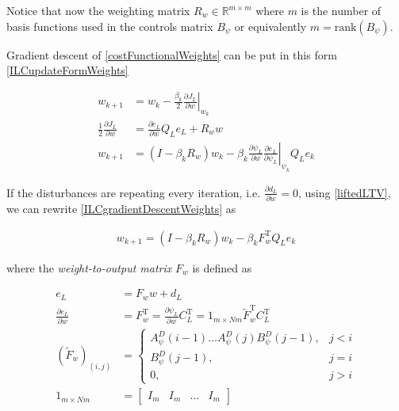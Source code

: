 \documentclass[10pt,a4paper]{article}
\newcommand\at[2]{\left.#1\right|_{#2}} %
\newcommand{\error}{e} %
\newcommand{\linDist}{d} %
\newcommand{\fullvec}{\psi} %
\newcommand{\weights}{w} %
\newcommand{\ValueFunction}{J}
\begin{document}
Notice that now the weighting matrix $R_w \in \mathbb{R}^{m \times m}$ where $m$ is the number of basis functions used in the controls matrix $B_{\fullvec}$ or equivalently $m = \text{rank}(B_{\fullvec})$.

Gradient descent of \eqref{costFunctionalWeights} can be put in this form \eqref{ILCupdateFormWeights}

\begin{equation}
\begin{aligned}
\weights_{k+1} &= \weights_k - \frac{\beta_k}{2} \at{\frac{\partial{\ValueFunction_L}}{\partial{\weights}}}{\weights_k} \\
\frac{1}{2}\frac{\partial{\ValueFunction_L}}{\partial{\weights}} &= \frac{\partial{\error_L}}{\partial{\weights}}Q_L\error_L + R_{\weights}\weights \\
\weights_{k+1} &= (I - \beta_kR_{\weights})\weights_k - \beta_k\frac{\partial{\fullvec_L}}{\partial{\weights}}\at{\frac{\partial{\error_L}}{\partial{\fullvec_L}}}{\fullvec_k}Q_L\error_k
\end{aligned}
\label{ILCgradientDescentWeights}
\end{equation}

If the disturbances are repeating every iteration, i.e. $\frac{\partial{\linDist_L}}{\partial{\weights}} = 0$, using \eqref{liftedLTV}, we can rewrite \eqref{ILCgradientDescentWeights} as

\begin{equation}
\begin{aligned}
\weights_{k+1} = (I - \beta_kR_{\weights})\weights_k - \beta_kF_{\weights}^\mathrm{T}Q_L\error_k
\end{aligned}
\label{ILCgradientDescentWeights2}
\end{equation}

where the \emph{weight-to-output matrix} $F_{\weights}$ is defined as

\begin{equation}
\begin{aligned}
\error_L &= F_{\weights}\weights + \linDist_L \\
\frac{\partial{\error_L}}{\partial{\weights}} &= F_{\weights}^{\mathrm{T}} = \frac{\partial{\fullvec_L}}{\partial{\weights}}C_L^{\mathrm{T}} = 1_{m\times Nm}\tilde{F}_{\weights}^{\mathrm{T}}C_L^{\mathrm{T}} \\
(\tilde{F}_{\weights})_{(i,j)} &= \left \{
\begin{array}{cc}
A^{D}_{\fullvec}(i-1)\ldots A^{D}_{\fullvec}(j)B^{D}_{\fullvec}(j-1), & j < i \\ 
B^{D}_{\fullvec}(j-1), & j = i \\
0, & j > i 
\end{array} \right. \\
1_{m\times Nm} &= \begin{bmatrix}
  I_{m} & I_{m} & \ldots & I_{m}
 \end{bmatrix}
\end{aligned}
\label{weightToOutputMatrix}
\end{equation}
\end{document}
